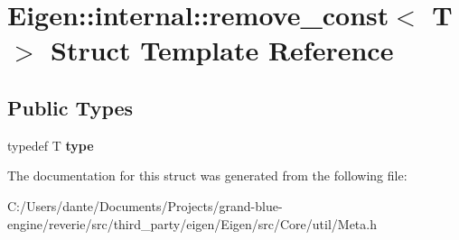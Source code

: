 \hypertarget{struct_eigen_1_1internal_1_1remove__const}{}\section{Eigen\+::internal\+::remove\+\_\+const$<$ T $>$ Struct Template Reference}
\label{struct_eigen_1_1internal_1_1remove__const}
\subsection*{Public Types}
\begin{DoxyCompactItemize}
\item 
\mbox{\label{struct_eigen_1_1internal_1_1remove__const_afe3dbb0bdee2ec8eed4416723d75bc90}} 
typedef T {\bfseries type}
\end{DoxyCompactItemize}


The documentation for this struct was generated from the following file\+:\begin{DoxyCompactItemize}
\item 
C\+:/\+Users/dante/\+Documents/\+Projects/grand-\/blue-\/engine/reverie/src/third\+\_\+party/eigen/\+Eigen/src/\+Core/util/Meta.\+h\end{DoxyCompactItemize}
